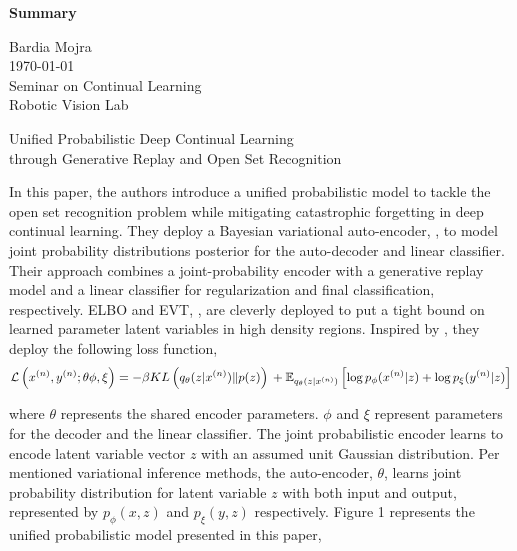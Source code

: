\documentclass[12pt]{article}
\begin{document}
\begin{center}
\textbf{Summary}\\
\end{center}

\noindent
Bardia Mojra\\
\today\\
Seminar on Continual Learning\\
Robotic Vision Lab\\
\begin{center}
Unified Probabilistic Deep Continual Learning\\
through Generative Replay and Open Set Recognition\\
\end{center}

In this paper, the authors introduce a unified probabilistic model to tackle the open set recognition problem while mitigating catastrophic forgetting in deep continual learning.
They deploy a Bayesian variational auto-encoder, \cite{kingma2013auto}, to model joint probability distributions posterior for the auto-decoder and linear classifier. Their approach combines a joint-probability encoder with a generative replay model and a linear classifier for regularization and final classification, respectively.
ELBO and EVT, \cite{hoffman2016elbo} \cite{bendale2014reliable}, are cleverly deployed to put a tight bound on learned parameter latent variables in high density regions. Inspired by \cite{higgins2016beta}, they deploy the following loss function,\\
\begin{equation}
\mathcal{L} \left( x^{(n)}, y^{(n)}; \theta \phi, \xi \right) = - \beta K L \\
\left( q_{\theta} ( z | x^{(n)} ) \| p(z) \right) \\
+ \mathbb{E}_{q_{\theta} (z|x^{(n)})} \\
\left[ \log p_{\phi} (x^{(n)}|z) + \log p_{\xi} (y^{(n)} | z) \right]
\end{equation}

\noindent
where $\theta$ represents the shared encoder parameters. $\phi$ and $\xi$ represent parameters for the decoder and the linear classifier. The joint probabilistic encoder learns to encode latent variable vector $z$ with an assumed unit Gaussian distribution. Per mentioned variational inference methods, the auto-encoder, $\theta$, learns joint probability distribution for latent variable $z$ with both input and output, represented by $p_{\phi}(x,z)$ and $p_{\xi}(y,z)$ respectively. Figure 1 represents the unified probabilistic model presented in this paper,\\
\end{document}
